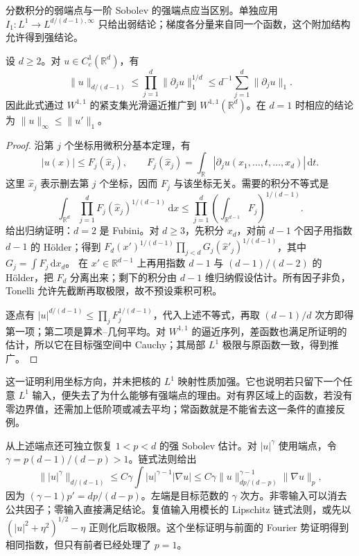 分数积分的弱端点与一阶 Sobolev 的强端点应当区别。单独应用 \(I_1:L^1\to L^{d/(d-1),\infty}\) 只给出弱结论；梯度各分量来自同一个函数，这个附加结构允许得到强结论。
\begin{theorem}\label{b2:thm:19-sobolev-l1}
设 \(d\geq2\)。对 \(u\in C_c^1(\mathbb R^d)\)，有
\[
 \|u\|_{d/(d-1)}
 \leq\prod_{j=1}^d\|\partial_ju\|_1^{1/d}
 \leq d^{-1}\sum_{j=1}^d\|\partial_ju\|_1.
\]
因此此式通过 \(W^{1,1}\) 的紧支集光滑逼近推广到 \(W^{1,1}(\mathbb R^d)\)。在 \(d=1\) 时相应的结论为 \(\|u\|_\infty\leq\|u'\|_1\)。
\end{theorem}
\begin{proof}
沿第 \(j\) 个坐标用微积分基本定理，有
\[
 |u(x)|\leq F_j(\widehat x_j),\qquad
 F_j(\widehat x_j)=\int_{\mathbb R}|\partial_ju(x_1,\ldots,t,\ldots,x_d)|\,\mathrm dt.
\]
这里 \(\widehat x_j\) 表示删去第 \(j\) 个坐标，因而 \(F_j\) 与该坐标无关。需要的积分不等式是
\[
 \int_{\mathbb R^d}\prod_{j=1}^d F_j(\widehat x_j)^{1/(d-1)}\,\mathrm dx
 \leq\prod_{j=1}^d\left(\int_{\mathbb R^{d-1}}F_j\right)^{1/(d-1)}.
\]
给出归纳证明：\(d=2\) 是 Fubini。对 \(d\geq3\)，先积分 \(x_d\)，对前 \(d-1\) 个因子用指数 \(d-1\) 的 Hölder；得到
\(F_d(x')^{1/(d-1)}\prod_{j<d}G_j(\widehat x'_j)^{1/(d-1)}\)，其中 \(G_j=\int F_j\,\mathrm dx_d\)。
在 \(x'\in\mathbb R^{d-1}\) 上再用指数 \(d-1\) 与 \((d-1)/(d-2)\) 的 Hölder，把 \(F_d\) 分离出来；剩下的积分由 \(d-1\) 维归纳假设估计。所有因子非负，Tonelli 允许先截断再取极限，故不预设乘积可积。

逐点有 \(|u|^{d/(d-1)}\leq\prod_jF_j^{1/(d-1)}\)，代入上述不等式，再取 \((d-1)/d\) 次方即得第一项；第二项是算术--几何平均。对 \(W^{1,1}\) 的逼近序列，差函数也满足所证明的估计，所以它在目标强空间中 Cauchy；其局部 \(L^1\) 极限与原函数一致，得到推广。
\end{proof}
这一证明利用坐标方向，并未把核的 \(L^1\) 映射性质加强。它也说明若只留下一个任意 \(L^1\) 输入，便失去了为什么能够有强端点的理由。对有界区域上的函数，若没有零边界值，还需加上低阶项或减去平均；常函数就是不能省去这一条件的直接反例。

\ProseParagraphBreak

从上述端点还可独立恢复 \(1<p<d\) 的强 Sobolev 估计。对 \(|u|^\gamma\) 使用端点，令 \(\gamma=p(d-1)/(d-p)>1\)。链式法则给出
\[
 \bigl\||u|^\gamma\bigr\|_{d/(d-1)}
 \leq C\gamma\int |u|^{\gamma-1}|\nabla u|
 \leq C\gamma\|u\|_{dp/(d-p)}^{\gamma-1}\|\nabla u\|_p,
\]
因为 \((\gamma-1)p'=dp/(d-p)\)。左端是目标范数的 \(\gamma\) 次方。非零输入可以消去公共因子；零输入直接满足结论。复值输入用模长的 Lipschitz 链式法则，或先以 \((|u|^2+\eta^2)^{1/2}-\eta\) 正则化后取极限。这个坐标证明与前面的 Fourier 势证明得到相同指数，但只有前者已经处理了 \(p=1\)。

